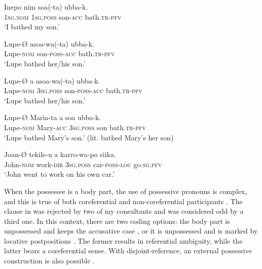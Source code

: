 \documentclass[output=paper]{langscibook}
\begin{document}
\ea%
    \label{ex:guerrero:23}

\ea
\label{ex:guerrero:23a}
\gll Inepo    nim     soa(-ta)  ubba-k.\\
    \textsc{1sg.nom}  \textsc{1sg.poss}  son-\textsc{acc}  bath.\textsc{tr}{}-\textsc{pfv}\\
\glt ‘I bathed my son.’

\ex
\label{ex:guerrero:23b}
\gll Lupe-Ø    asoa-wa(-ta)  ubba-k.\\
    Lupe-\textsc{nom}  son-\textsc{poss-acc}  bath.\textsc{tr-pfv}\\
\glt ‘Lupe bathed her/his son.’

\ex
\label{ex:guerrero:23c}
\gll Lupe-Ø    a     asoa-wa(-ta)   ubba-k.\\
    Lupe-\textsc{nom}  \textsc{3sg.poss}  son-\textsc{poss-acc}  bath.\textsc{tr-pfv}\\
\glt ‘Lupe bathed her/his son.’

\ex
\label{ex:guerrero:23d}
\gll Lupe-Ø    Maria-ta   a   soa  ubba-k.\\
    Lupe-\textsc{nom}  Mary\textsc{{}-acc}  \textsc{3sg.poss}  son  bath.\textsc{tr-pfv}\\
\glt ‘Lupe bathed Mary’s son.’ (lit. bathed Mary’s her son)

\ex
\label{ex:guerrero:23e}
\gll Joan-Ø tekile-u a karro-wa-po  siika.\\
    John-\textsc{nom}  work\textsc{{}-dir}  \textsc{3sg.poss} car-\textsc{poss-loc}  go.\textsc{sg.pfv}\\
\glt ‘John went to work on his own car.’
\z
\z



When the possessee is a body part, the use of possessive pronouns is complex, and this is true of both coreferential and non-coreferential participants \citep{Guerrero2020} . The clause in  was rejected by two of my consultants and was considered odd by a third one. In this context, there are two coding options: the body part is unpossessed and keeps the accusative case , or it is unpossessed and is marked by locative postpositions . The former results in referential ambiguity, while the latter bears a coreferential sense. With disjoint-reference, an external possessive construction is also possible .



\ea%
    \label{ex:guerrero:24}
\end{document}
